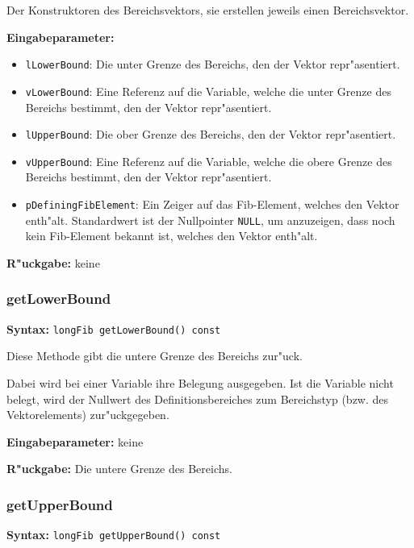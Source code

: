 \bigskip\noindent
Der Konstruktoren des Bereichsvektors, sie erstellen jeweils einen Bereichsvektor.

\bigskip\noindent
\textbf{Eingabeparameter:}
\begin{itemize}
 \item \verb|lLowerBound|: Die unter Grenze des Bereichs, den der Vektor repr"asentiert.
 \item \verb|vLowerBound|: Eine Referenz auf die Variable, welche die unter Grenze des Bereichs bestimmt, den der Vektor repr"asentiert.
 \item \verb|lUpperBound|: Die ober Grenze des Bereichs, den der Vektor repr"asentiert.
 \item \verb|vUpperBound|: Eine Referenz auf die Variable, welche die obere Grenze des Bereichs bestimmt, den der Vektor repr"asentiert.
 \item \verb|pDefiningFibElement|: Ein Zeiger auf das Fib-Element, welches den Vektor enth"alt. Standardwert ist der Nullpointer \verb|NULL|, um anzuzeigen, dass noch kein Fib-Element bekannt ist, welches den Vektor enth"alt.
\end{itemize}

\bigskip\noindent
\textbf{R"uckgabe:} keine


\subsubsection{getLowerBound}

\textbf{Syntax:} \verb|longFib getLowerBound() const|

\bigskip\noindent
Diese Methode gibt die untere Grenze des Bereichs zur"uck.

Dabei wird bei einer Variable ihre Belegung ausgegeben. Ist die Variable nicht belegt, wird der Nullwert des Definitionsbereiches zum Bereichstyp (bzw. des Vektorelements) zur"uckgegeben.

\bigskip\noindent
\textbf{Eingabeparameter:} keine

\bigskip\noindent
\textbf{R"uckgabe:} Die untere Grenze des Bereichs.


\subsubsection{getUpperBound}

\textbf{Syntax:} \verb|longFib getUpperBound() const|

